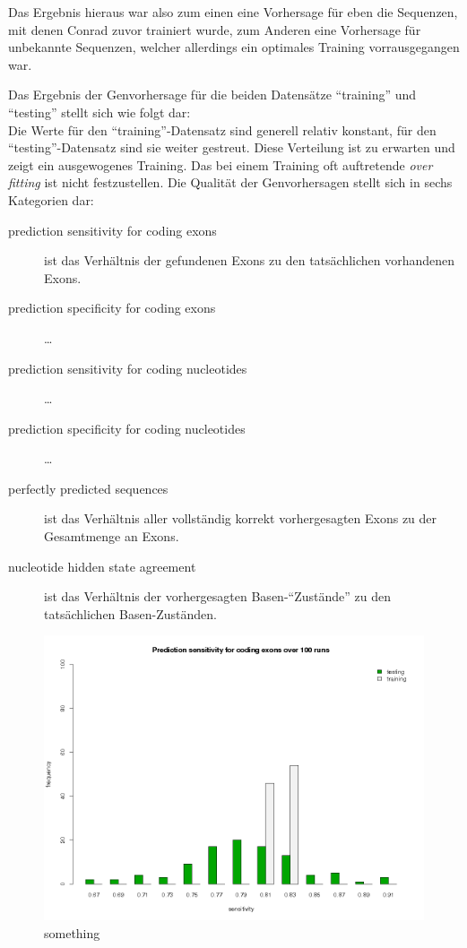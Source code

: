 Das Ergebnis hieraus war also zum einen eine Vorhersage für eben die Sequenzen,
mit denen Conrad zuvor trainiert wurde, zum Anderen eine Vorhersage für unbekannte
Sequenzen, welcher allerdings ein optimales Training vorrausgegangen war.

Das Ergebnis der Genvorhersage für die beiden Datensätze \enquote{training} und
\enquote{testing} stellt sich wie folgt dar:\\
Die Werte für den \enquote{training}-Datensatz sind generell relativ konstant,
für den \enquote{testing}-Datensatz sind sie weiter gestreut.
Diese Verteilung ist zu erwarten und zeigt ein ausgewogenes Training.
Das bei einem Training oft auftretende \textit{over fitting} ist nicht
festzustellen.
Die Qualität der Genvorhersagen stellt sich in sechs Kategorien dar:
\begin{description}
\item[prediction sensitivity for coding exons] ist das Verhältnis
der gefundenen Exons zu den tatsächlichen vorhandenen Exons.
\item[prediction specificity for coding exons] \ldots
\item[prediction sensitivity for coding nucleotides] \ldots
\item[prediction specificity for coding nucleotides] \ldots
\item[perfectly predicted sequences] ist das Verhältnis aller
vollständig korrekt vorhergesagten Exons zu der Gesamtmenge an Exons.
\item[nucleotide hidden state agreement] ist das Verhältnis der vorhergesagten
Basen-\enquote{Zustände} zu den tatsächlichen Basen-Zuständen.
\end{description}

\begin{figure}[ht]
	\begin{center}
		\includegraphics[scale=0.42]{pics/codingExons_sens.png}
	\caption{something}
	\end{center}
	\label{fig:perfect}
\end{figure}

